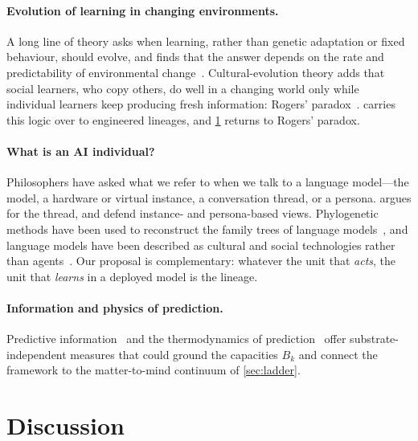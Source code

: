 \documentclass[11pt]{article}
\theoremstyle{plain}
\theoremstyle{definition}
\theoremstyle{remark}
\begin{document}
\paragraph{Evolution of learning in changing environments.}
A long line of theory asks when learning, rather than genetic adaptation or fixed behaviour, should evolve, and finds that the answer depends on the rate and predictability of environmental change~\citep{stephens1991change,kussell2005phenotypic,botero2015evolutionary}. Cultural-evolution theory adds that social learners, who copy others, do well in a changing world only while individual learners keep producing fresh information: Rogers' paradox~\citep{rogers1988does,rendell2010rogers}.  carries this logic over to engineered lineages, and \cref{sec:discussion} returns to Rogers' paradox.

\paragraph{What is an AI individual?}
Philosophers have asked what we refer to when we talk to a language model---the model, a hardware or virtual instance, a conversation thread, or a persona. \citet{chalmers2025what} argues for the thread, and \citet{beckmann2026where} defend instance- and persona-based views. Phylogenetic methods have been used to reconstruct the family trees of language models~\citep{yax2025phylolm}, and language models have been described as cultural and social technologies rather than agents~\citep{farrell2025large,yiu2024transmission}. Our proposal is complementary: whatever the unit that \emph{acts}, the unit that \emph{learns} in a deployed model is the lineage.

\paragraph{Information and physics of prediction.}
Predictive information~\citep{bialek2001predictability} and the thermodynamics of prediction~\citep{still2012thermodynamics} offer substrate-independent measures that could ground the capacities $B_k$ and connect the framework to the matter-to-mind continuum of \cref{sec:ladder}.

\section{Discussion}
\label{sec:discussion}
\end{document}
